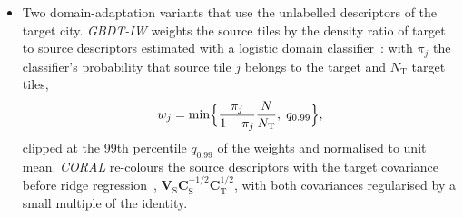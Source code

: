 \begin{itemize}
source descriptors and $\boldsymbol\Theta$ the $N\times2$ matrix of labels,
\begin{equation}
\hat\btheta_u^{\top}=\tilde{\bv}_u^{\top}\bigl(\mathbf{V}^{\top}\mathbf{V}+\alpha\mathbf{I}\bigr)^{-1}\mathbf{V}^{\top}\boldsymbol\Theta,
\label{eq:ridge}
\end{equation}
with an unpenalised intercept; a two-layer \emph{MLP} (two hidden layers
of 256 units, targets standardised on the training tiles, trained epoch by
epoch); gradient-boosted trees (\emph{GBDT}, LightGBM~\cite{ke2017lightgbm})
with one model per target, each an additive ensemble
$F_M(\bv)=\sum_{m=1}^{M}f_m(\bv)$ of regression trees fitted by gradient
boosting of the squared error; and a \emph{neural encoder} with a
constrained $(\gamma,P_{L_0})$ head trained with a heteroscedastic Gaussian
likelihood.
\item Two domain-adaptation variants that use the unlabelled descriptors of
the target city. \emph{GBDT-IW} weights the source tiles by the density
ratio of target to source descriptors estimated with a logistic domain
classifier~\cite{shimodaira2000}: with $\pi_j$ the classifier's probability
that source tile $j$ belongs to the target and $N_{\mathrm{T}}$ target
tiles,
\begin{equation}
w_j=\min\Bigl\{\frac{\pi_j}{1-\pi_j}\frac{N}{N_{\mathrm{T}}},\;q_{0.99}\Bigr\},
\label{eq:iw}
\end{equation}
clipped at the 99th percentile $q_{0.99}$ of the weights and normalised to
unit mean. \emph{CORAL} re-colours the source descriptors with the target
covariance before ridge regression~\cite{sun2016coral},
$\mathbf{V}_{\mathrm{S}}\mathbf{C}_{\mathrm{S}}^{-1/2}\mathbf{C}_{\mathrm{T}}^{1/2}$,
with both covariances regularised by a small multiple of the identity.
\end{itemize}

